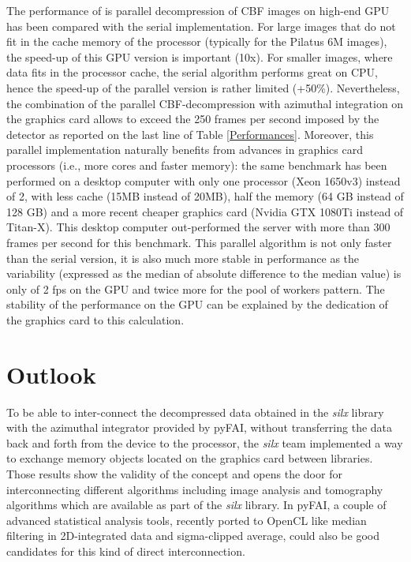 \documentclass[preprint]{iucr}              %
\begin{document}
The performance of is parallel decompression of CBF images on high-end GPU has
been compared with the serial implementation. 
For large images that do not fit in the cache memory of the
processor (typically for the Pilatus 6M images), the speed-up of this GPU
version is important (10x).
For smaller images, where data fits in the processor cache, the serial
algorithm performs great on CPU, hence the speed-up of the parallel version is
rather limited (+50\%). 
Nevertheless, the combination of the parallel CBF-decompression with azimuthal
integration on the graphics card allows to exceed the 250 frames per second
imposed by the detector as reported on the last line of Table
\ref{Performances}.
Moreover, this parallel implementation naturally benefits from advances in
graphics card processors (i.e., more cores and faster memory):
the same benchmark has been performed on a desktop computer with only one
processor (Xeon 1650v3) instead of 2, with less cache (15MB instead of 20MB),
half the memory (64 GB instead of 128 GB) and a more recent cheaper graphics card
(Nvidia GTX 1080Ti instead of Titan-X).
This desktop computer out-performed the server with more than
300 frames per second for this benchmark.
This parallel algorithm is not only faster than the serial version, it is also
much more stable in performance as the variability (expressed
as the median of absolute difference to the median value) is only of 2 fps on 
the GPU and twice more for the pool of workers pattern. 
The stability of the performance on the GPU can be explained by the dedication
of the graphics card to this calculation.

\section{Outlook}

To be able to inter-connect the decompressed data obtained in the \textit{silx}
library with the azimuthal integrator provided by pyFAI, without transferring the data
back and forth from the device to the processor, the \textit{silx} team implemented a
way to exchange memory objects located on the graphics card between libraries. 
Those results show the validity of the concept and opens the door for
interconnecting different algorithms including image analysis and
tomography algorithms which are available as part of the \textit{silx} library.
In pyFAI, a couple of advanced statistical analysis tools, recently ported to
OpenCL like median filtering in 2D-integrated data and sigma-clipped
average, could also be good candidates for this kind of direct interconnection.
\end{document}
